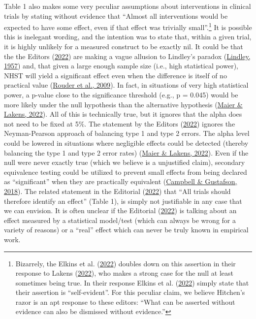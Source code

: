 \documentclass[]{cik}%
\begin{document}
Table 1 also makes some very peculiar assumptions about interventions in
clinical trials by stating without evidence that ``Almost all
interventions would be expected to have some effect, even if that effect
was trivially small''.\footnote{Bizarrely, the Elkins et al.
  (\protect\hyperlink{ref-elkinsres}{2022}) doubles down on this
  assertion in their response to Lakens
  (\protect\hyperlink{ref-lakensres}{2022}), who makes a strong case for
  the null at least sometimes being true. In their response Elkins et
  al. (\protect\hyperlink{ref-elkinsres}{2022}) simply state that their
  assertion is ``self-evident''. For this peculiar claim, we believe
  Hitchen's razor is an apt response to these editors: ``What can be
  asserted without evidence can also be dismissed without evidence.''}
It is possible this is inelegant wording, and the intention was to state
that, within a given trial, it is highly unlikely for a measured
construct to be exactly nil. It could be that the the Editors
(\protect\hyperlink{ref-elkins2022}{2022}) are making a vague allusion
to Lindley's paradox (\protect\hyperlink{ref-lindley}{Lindley, 1957})
and, that given a large enough sample size (i.e., high statistical
power), NHST will yield a significant effect even when the difference is
itself of no practical value
(\protect\hyperlink{ref-rouder2009bayesian}{Rouder et al., 2009}). In
fact, in situations of very high statistical power, a p-value close to
the significance threshold (e.g., p = 0.045) would be more likely under
the null hypothesis than the alternative hypothesis
(\protect\hyperlink{ref-maier2022}{Maier \& Lakens, 2022}). All of this
is technically true, but it ignores that the alpha does not need to be
fixed at 5\%. The statement by the Editors
(\protect\hyperlink{ref-elkins2022}{2022}) ignores the Neyman-Pearson
approach of balancing type 1 and type 2 errors. The alpha level could be
lowered in situations where negligible effects could be detected
(thereby balancing the type 1 and type 2 error rates)
(\protect\hyperlink{ref-maier2022}{Maier \& Lakens, 2022}). Even if the
null were never exactly true (which we believe is a unjustified claim),
secondary equivalence testing could be utilized to prevent small effects
from being declared as ``significant'' when they are practically
equivalent (\protect\hyperlink{ref-campbell2018}{Campbell \& Gustafson,
2018}). The related statement in the Editorial
(\protect\hyperlink{ref-elkins2022}{2022}) that ``All trials should
therefore identify an effect'' (Table 1), is simply not justifiable in
any case that we can envision. It is often unclear if the Editorial
(\protect\hyperlink{ref-elkins2022}{2022}) is talking about an effect
measured by a statistical model/test (which can always be wrong for a
variety of reasons) or a ``real'' effect which can never be truly known
in empirical work.
\end{document}
